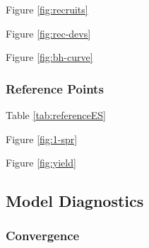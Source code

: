 \documentclass[11pt,
  english,
  a4paper,
]{article}
\begin{document}
Figure \ref{fig:recruits}

\leavevmode\tagmcend\tagstructend\par


Figure \ref{fig:rec-devs}

\leavevmode\tagmcend\tagstructend\par


Figure \ref{fig:bh-curve}

\leavevmode\tagmcend\tagstructend\par


\hypertarget{reference-points}{%
\subsubsection{Reference Points}\label{reference-points}}

\leavevmode\tagmcend\tagstructend


Table \ref{tab:referenceES}

\leavevmode\tagmcend\tagstructend\par


Figure \ref{fig:1-spr}

\leavevmode\tagmcend\tagstructend\par


Figure \ref{fig:yield}

\leavevmode\tagmcend\tagstructend\par


\hypertarget{model-diagnostics}{%
\subsection{Model Diagnostics}\label{model-diagnostics}}

\leavevmode\tagmcend\tagstructend


\hypertarget{convergence}{%
\subsubsection{Convergence}\label{convergence}}
\end{document}
